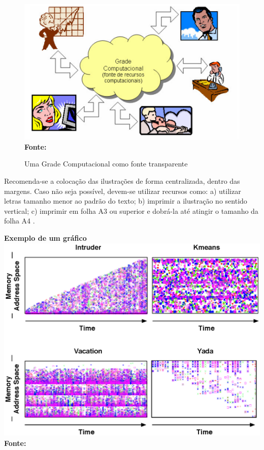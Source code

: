 \begin{figure}[ht]
	\centering	
	\caption[\hspace{0.1cm}Grade Computacional.]{Uma Grade Computacional como fonte transparente}
	\vspace{-0.2cm}
	\includegraphics[width=.6\textwidth]{figuras/grade-comp.png}
	 \vspace{-0.2cm}
	\\\textbf{\footnotesize Fonte: \cite{cap-livro} }
	\label{fig:figura1}
\end{figure}

Recomenda-se a colocação das ilustrações de forma centralizada, dentro das margens. 
Caso não seja possível, devem-se utilizar recursos como: a) utilizar letras tamanho menor ao padrão do texto; b) imprimir a
ilustração no sentido vertical; c) imprimir em folha A3 ou superior e
dobrá-la até atingir o tamanho da folha A4 \cite{manualpuc}. 

\begin{center}
	\centering	
 	\textbf{Exemplo de um gráfico} \\
	\includegraphics[width=.7\textwidth]{figuras/graficos/access_patterns.eps}
	 \vspace{-0.3cm}
	\\\textbf{\footnotesize Fonte: \cite{tese}}
	\label{fig:grafico1}
\end{center}

